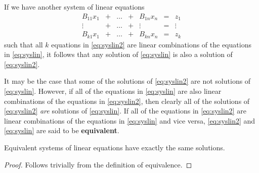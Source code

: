 \documentclass[12pt]{article}
\begin{document}
\begin{defn}
  If we have another system of linear equations
  \begin{equation} \label{eq:syslin2}
  \begin{array}{ccccccc}
    B_{11}x_1 & + & \ldots & + & B_{1n}x_n & = & z_1\\
    \vdots    & + & \ldots & + & \vdots    & = & \vdots\\
    B_{k1}x_1 & + & \ldots & + & B_{kn}x_n & = & z_k
  \end{array}
  \end{equation}
  such that all $k$ equations in \eqref{eq:syslin2} are linear
  combinations of the equations in \eqref{eq:syslin}, it follows
  that any solution of \eqref{eq:syslin} is also a solution of
  \eqref{eq:syslin2}.

  It may be the case that some of the solutions of
  \eqref{eq:syslin2} are not solutions of \eqref{eq:syslin}.
  However, if all of the equations in \eqref{eq:syslin} are also
  linear combinations of the equations in \eqref{eq:syslin2},
  then clearly all of the solutions of \eqref{eq:syslin2}
  \textit{are} solutions of \eqref{eq:syslin}. If all of the
  equations in \eqref{eq:syslin2} are linear combinations of the
  equations in \eqref{eq:syslin} and vice versa,
  \eqref{eq:syslin2} and \eqref{eq:syslin} are said to be
  \textbf{equivalent}.
\end{defn}

\begin{thm}
  Equivalent systems of linear equations have exactly the same
  solutions.
  \begin{proof}
    Follows trivially from the definition of equivalence.
  \end{proof}
\end{thm}
\end{document}
